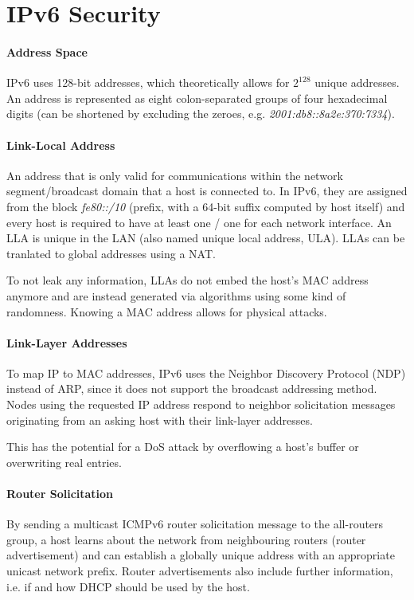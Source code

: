 \section{IPv6 Security}

\paragraph{Address Space}
IPv6 uses 128-bit addresses, which theoretically allows for $2^{128}$ unique addresses. An address is represented as eight colon-separated groups of four hexadecimal digits (can be shortened by excluding the zeroes, e.g. \textit{2001:db8::8a2e:370:7334}).

\paragraph{Link-Local Address}
An address that is only valid for communications within the network segment/broadcast domain that a host is connected to. In IPv6, they are assigned from the block \textit{fe80::/10} (prefix, with a 64-bit suffix computed by host itself) and every host is required to have at least one / one for each network interface. An LLA is unique in the LAN (also named unique local address, ULA). LLAs can be tranlated to global addresses using a NAT.

To not leak any information, LLAs do not embed the host's MAC address anymore and are instead generated via algorithms using some kind of randomness. Knowing a MAC address allows for physical attacks.

\paragraph{Link-Layer Addresses} To map IP to MAC addresses, IPv6 uses the Neighbor Discovery Protocol (NDP) instead of ARP, since it does not support the broadcast addressing method. Nodes using the requested IP address respond to neighbor solicitation messages originating from an asking host with their link-layer addresses.

This has the potential for a DoS attack by overflowing a host's buffer or overwriting real entries.

\paragraph{Router Solicitation}
By sending a multicast ICMPv6 router solicitation message to the all-routers group, a host learns about the network from neighbouring routers (router advertisement) and can establish a globally unique address with an appropriate unicast network prefix. Router advertisements also include further information, i.e. if and how DHCP should be used by the host.

